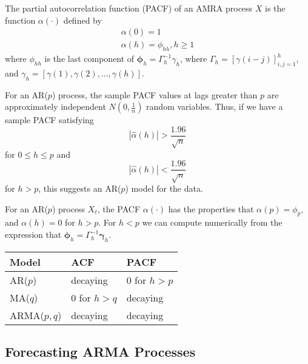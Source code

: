 \begin{defn}[PACF]
  \label{defn:arma_processes:8}
  The partial autocorrelation function (PACF) of an AMRA process $X$
  is the function $\alpha(\cdot)$ defined by
  \begin{align}
    \label{eq:31}
    \alpha(0) = 1 \\
    \alpha(h) = \phi_{hh}, h \geq 1
  \end{align} where $\phi_{hh}$ is the last component of
  $\mathbf{\phi}_{h} = \Gamma_{h}^{-1} \gamma_{h}$, where $\Gamma_{h}
  = [\gamma(i - j)]^{h}_{i,j = 1}$, and $\gamma_{h} = [\gamma(1),
  \gamma(2), \dots, \gamma(h)]$.
\end{defn}

\begin{thm}
  \label{defn:arma_processes:9}
  For an AR($p$) process, the sample PACF values at lags greater than
  $p$ are approximately independent $N(0, \frac{1}{n})$ random
  variables.  Thus, if we have a sample PACF satisfying
  \begin{equation}
    \label{eq:32}
    |\hat \alpha(h)| > \frac{1.96}{\sqrt{n}}
  \end{equation} for $0 \leq h \leq p$ and
  \begin{equation}
    \label{eq:33}
    |\hat \alpha(h)| < \frac{1.96}{\sqrt{n}}
  \end{equation} for $h > p$, this suggests an AR($p$) model for the data.
\end{thm}

\begin{thm}
  \label{defn:arma_processes:10}
  For an AR($p$) process $X_{t}$, the PACF $\alpha(\cdot)$ has the
  properties that $\alpha(p) = \phi_{p}$, and $\alpha(h) = 0$ for $h >
  p$.  For $h < p$ we can compute numerically from the expression that
  $\mathbf{\phi}_{h} = \Gamma^{-1}_{h} \mathbf{\gamma}_{h}$.
\end{thm}

\begin{table}
  \centering
  \begin{tabular}{lll}
    \toprule
    Model & ACF & PACF \\
    \midrule
    AR($p$) & decaying & 0 for $h > p$ \\
    MA($q$) & $0$ for $h > q$ & decaying \\
    \textsc{ARMA}($p, q$) & decaying & decaying
  \end{tabular}
\end{table}

\subsection{Forecasting \textsc{ARMA} Processes}
\label{sec:forec-arma-proc}


